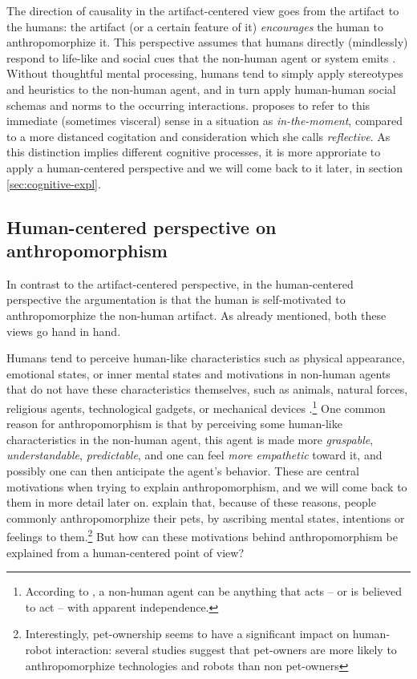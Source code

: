 \documentclass{frontiersSCNS} %
\begin{document}
The direction of causality in the artifact-centered view goes from the artifact
to the humans: the artifact (or a certain feature of it) \emph{encourages} the
human to anthropomorphize it.  This perspective assumes that humans directly
(mindlessly) respond to life-like and social cues that the non-human agent or
system emits \citep{nass_machines_2000}. Without thoughtful mental processing,
humans tend to simply apply stereotypes and heuristics to the non-human agent,
and in turn apply human-human social schemas and norms to the occurring
interactions.  \cite{takayama_perspectives_2012} proposes to refer to this
immediate (sometimes visceral) sense in a situation as \textit{in-the-moment},
compared to a more distanced cogitation and consideration which she calls
\textit{reflective}. As this distinction implies different cognitive processes,
it is more approriate to apply a human-centered perspective and we will come
back to it later, in section \ref{sec:cognitive-expl}.


%
%
%
%
%
%

\subsection{Human-centered perspective on anthropomorphism}

In contrast to the artifact-centered perspective, in the human-centered
perspective the argumentation is that the human is self-motivated to
anthropomorphize the non-human artifact. As already mentioned, both these views
go hand in hand.

Humans tend to perceive human-like characteristics such as physical appearance,
emotional states, or inner mental states and motivations in non-human agents
that do not have these characteristics themselves, such as animals, natural
forces, religious agents, technological gadgets, or mechanical devices
\citep{epley_when_2008}.\footnote{According to \citet{epley_when_2008}, a
non-human agent can be anything that acts -- or is believed to act -- with
apparent independence.} One common reason for anthropomorphism is that by
perceiving some human-like characteristics in the non-human agent, this agent is
made more \emph{graspable}, \emph{understandable}, \emph{predictable}, and one
can feel \emph{more empathetic} toward it, and possibly one can then anticipate
the agent's behavior. These are central motivations when trying to explain
anthropomorphism, and we will come back to them in more detail later on.
\citet{eddy_attribution_1993} explain that, because of these reasons, people
commonly anthropomorphize their pets, by ascribing mental states, intentions or
feelings to them.\footnote{Interestingly, pet-ownership seems to have a
significant impact on human-robot interaction: several studies suggest that
pet-owners are more likely to anthropomorphize technologies and robots than
non pet-owners} But how can these motivations behind anthropomorphism be
explained from a human-centered point of view?
\end{document}
